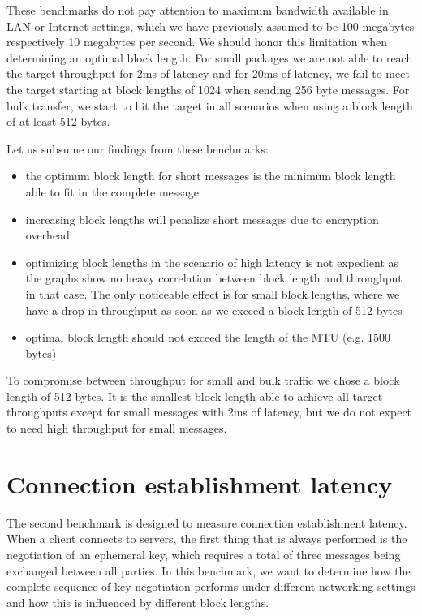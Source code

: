 These benchmarks do not pay attention to maximum bandwidth available in LAN or Internet settings, which we have previously assumed to be 100 megabytes respectively 10 megabytes per second.
We should honor this limitation when determining an optimal block length.
For small packages we are not able to reach the target throughput for 2ms of latency and for 20ms of latency, we fail to meet the target starting at block lengths of 1024 when sending 256 byte messages.
For bulk transfer, we start to hit the target in all scenarios when using a block length of at least 512 bytes.

\medskip

Let us subsume our findings from these benchmarks:
\begin{itemize}
    \item the optimum block length for short messages is the minimum block length able to fit in the complete message
    \item increasing block lengths will penalize short messages due to encryption overhead
    \item optimizing block lengths in the scenario of high latency is not expedient as the graphs show no heavy correlation between block length and throughput in that case.
        The only noticeable effect is for small block lengths, where we have a drop in throughput as soon as we exceed a block length of 512 bytes
    \item optimal block length should not exceed the length of the MTU (e.g. 1500 bytes)
\end{itemize}

To compromise between throughput for small and bulk traffic we chose a block length of 512 bytes.
It is the smallest block length able to achieve all target throughputs except for small messages with 2ms of latency, but we do not expect to need high throughput for small messages.

\section{Connection establishment latency}

The second benchmark is designed to measure connection establishment latency.
When a client connects to servers, the first thing that is always performed is the negotiation of an ephemeral key, which requires a total of three messages being exchanged between all parties.
In this benchmark, we want to determine how the complete sequence of key negotiation performs under different networking settings and how this is influenced by different block lengths.


